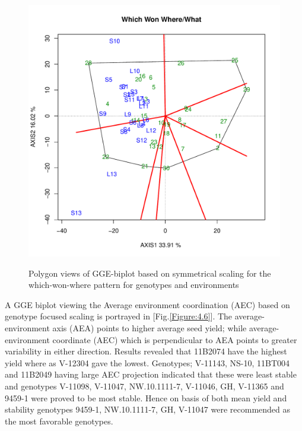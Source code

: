 \begin{figure} [H]
	\centering  
	\scalebox{0.3}
	{\includegraphics[width=460mm]{02ThesisMain/Ch04RD/figures/www}}
	\caption[Polygon views of GGE-biplot based on symmetrical scaling]{Polygon views of GGE-biplot based on symmetrical scaling for the which-won-where pattern for genotypes and environments}
\label{Figure:4.5}
\end{figure}




A GGE biplot viewing the Average environment coordination (AEC) based on genotype focused scaling is portrayed in [Fig.\ref{Figure:4.6}]. The average-environment axis (AEA) points to higher average seed yield; while average-environment coordinate (AEC) which is perpendicular to AEA points to greater variability in either direction. Results revealed that 11B2074 have the highest yield where as V-12304 gave the lowest. Genotypes; V-11143, NS-10, 11BT004 and 11B2049 having large AEC projection indicated that these were least stable and genotypes V-11098, V-11047, NW.10.1111-7, V-11046,  GH,  V-11365 and 9459-1 were proved to be most stable. Hence on basis of both mean yield and stability genotypes 9459-1, NW.10.1111-7, GH, V-11047 were recommended as the most favorable genotypes.      


